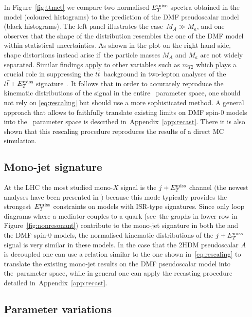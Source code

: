{\color{red} In Figure~\ref{fig:ttmet} we compare two normalised $E_T^\mathrm{miss}$ spectra obtained in the \hdma model (coloured histograms) to the prediction of the DMF pseudoscalar   model (black histograms).  The left panel illustrates the case~$M_A \gg M_a$, and one observes that the shape of the \hdma distribution resembles  the one of the DMF model within statistical uncertainties. As shown in the plot on the right-hand side, shape distortions instead arise if~the particle masses $M_A$ and $M_a$ are not widely separated.  Similar findings apply to other variables such as $m_{T2}$ which  plays a crucial role in suppressing the $t \bar t$~background in two-lepton analyses of the $t \bar t + E_T^\mathrm{miss}$ signature~\cite{Aaboud:2017rzf,Haisch:2016gry}. It follows that in order to accurately reproduce the kinematic distributions of the signal in the entire \hdma~parameter space, one should not rely on \eqref{eq:rescaling} but should use a more sophisticated method. A general approach  that allows to faithfully translate existing limits on DMF spin-0   models into the \hdma~parameter space  is described in~Appendix~\ref{app:recast}. There it is also shown that this rescaling procedure reproduces the results of a direct MC simulation. 
}

\subsection*{Mono-jet signature}

At the LHC the most studied mono-$X$ signal is the $j +E_T^\mathrm{miss}$ channel $\big($the newest analyses have been presented in \cite{Aaboud:2017phn,Sirunyan:2017jix}$\big)$ because this mode typically provides the strongest~$E_T^\mathrm{miss}$ constraints on models with ISR-type  signatures. Since only loop diagrams where a mediator couples to a quark (see~the graphs in lower row in Figure~\ref{fig:nonresonant}) contribute to the mono-jet signature in both the \hdma and the DMF spin-0 models, the normalised kinematic distributions of the $j +E_T^\mathrm{miss}$ signal is very similar in these models. In the case that the 2HDM pseudoscalar $A$ is decoupled one can use a relation similar to the one shown in~\eqref{eq:rescaling} to translate the existing mono-jet results on the DMF pseudoscalar model into the~\hdma parameter space, while in general one can apply the recasting procedure detailed in~Appendix~\ref{app:recast}.

\subsection{Parameter variations}

